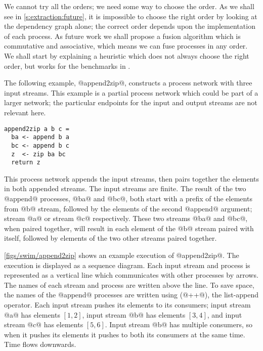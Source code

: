 We cannot try all the orders; we need some way to choose the order.
As we shall see in \autoref{s:extraction:future}, it is impossible to choose the right order by looking at the dependency graph alone; the correct order depends upon the implementation of each process.
As future work we shall propose a fusion algorithm which is commutative and associative, which means we can fuse processes in any order.
We shall start by explaining a heuristic which does not always choose the right order, but works for the benchmarks in .

The following example, @append2zip@, constructs a process network with three input streams.
This example is a partial process network which could be part of a larger network; the particular endpoints for the input and output streams are not relevant here.

\begin{lstlisting}
append2zip a b c =
  ba <- append b a
  bc <- append b c
  z  <- zip ba bc
  return z
\end{lstlisting}

This process network appends the input streams, then pairs together the elements in both appended streams.
The input streams are finite.
The result of the two @append@ processes, @ba@ and @bc@, both start with a prefix of the elements from @b@ stream, followed by the elements of the second @append@ argument; stream @a@ or stream @c@ respectively.
These two streams @ba@ and @bc@, when paired together, will result in each element of the @b@ stream paired with itself, followed by elements of the two other streams paired together.


\autoref{figs/swim/append2zip} shows an example execution of @append2zip@.
The execution is displayed as a sequence diagram.
Each input stream and process is represented as a vertical line which communicates with other processes by arrows.
The names of each stream and process are written above the line.
To save space, the names of the @append@ processes are written using (@++@), the list-append operator.
Each input stream pushes its elements to its consumers; input stream @a@ has elements $[1, 2]$, input stream @b@ has elements $[3, 4]$, and input stream @c@ has elements $[5, 6]$.
Input stream @b@ has multiple consumers, so when it pushes its elements it pushes to both its consumers at the same time.
Time flows downwards.


